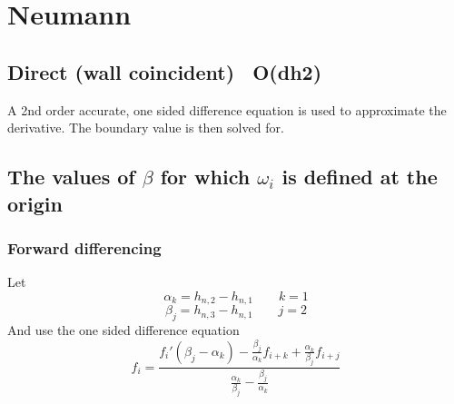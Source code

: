 \documentclass[11pt]{article}
\begin{document}


\section{Neumann}
\subsection{Direct (wall coincident) ~O(dh2)}
A 2nd order accurate, one sided difference equation is used to approximate the derivative. The boundary value is then solved for.

\subsection[alternative title goes here]{The values of $\beta$ for which $\omega_i$ is defined at the origin}

\subsubsection{Forward differencing}
Let
\begin{equation}
	\alpha_k = h_{n,2} - h_{n,1} \qquad k = 1
\end{equation}
\begin{equation}
	\beta_j = h_{n,3} - h_{n,1} \qquad j = 2
\end{equation}
And use the one sided difference equation
\begin{equation}
	f_i = \frac{f_i' (\beta_j - \alpha_k) - \frac{\beta_j}{\alpha_k} f_{i+k} + \frac{\alpha_k}{\beta_j} f_{i+j}}{\frac{\alpha_k}{\beta_j} - \frac{\beta_j}{\alpha_k}}
\end{equation}
\end{document}
